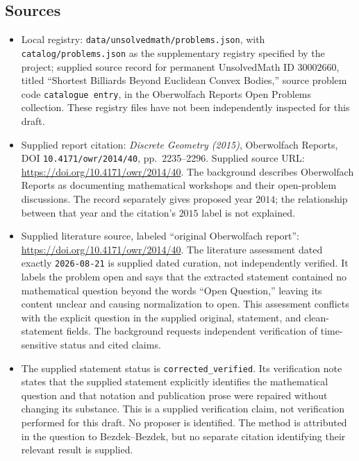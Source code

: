 \documentclass[11pt]{article}
\begin{document}
\subsection{Sources}
\begin{itemize}
\item Local registry: \texttt{data/unsolvedmath/problems.json}, with \texttt{catalog/problems.json} as the supplementary registry specified by the project; supplied source record for permanent UnsolvedMath ID \(30002660\), titled ``Shortest Billiards Beyond Euclidean Convex Bodies,'' source problem code \texttt{catalogue entry}, in the Oberwolfach Reports Open Problems collection. These registry files have not been independently inspected for this draft.
\item Supplied report citation: \emph{Discrete Geometry (2015)}, Oberwolfach Reports, DOI \texttt{10.4171/owr/2014/40}, pp.\ 2235--2296. Supplied source URL: \url{https://doi.org/10.4171/owr/2014/40}. The background describes Oberwolfach Reports as documenting mathematical workshops and their open-problem discussions. The record separately gives proposed year \(2014\); the relationship between that year and the citation's \(2015\) label is not explained.
\item Supplied literature source, labeled ``original Oberwolfach report'': \url{https://doi.org/10.4171/owr/2014/40}. The literature assessment dated exactly \texttt{2026-08-21} is supplied dated curation, not independently verified. It labels the problem open and says that the extracted statement contained no mathematical question beyond the words ``Open Question,'' leaving its content unclear and causing normalization to open. This assessment conflicts with the explicit question in the supplied original, statement, and clean-statement fields. The background requests independent verification of time-sensitive status and cited claims.
\item The supplied statement status is \texttt{corrected\_verified}. Its verification note states that the supplied statement explicitly identifies the mathematical question and that notation and publication prose were repaired without changing its substance. This is a supplied verification claim, not verification performed for this draft. No proposer is identified. The method is attributed in the question to Bezdek--Bezdek, but no separate citation identifying their relevant result is supplied.
\end{itemize}
\end{document}
